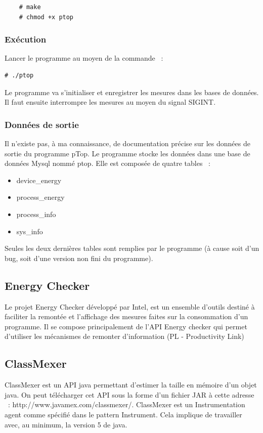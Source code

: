 \documentclass[a4paper, 11pt]{report}
\begin{document}
\begin{verbatim}
	# make
	# chmod +x ptop
\end{verbatim}

\subsubsection{Exécution}
Lancer le programme au moyen de la commande ~:

\begin{verbatim}
# ./ptop
\end{verbatim}

Le programme va s'initialiser et enregistrer les mesures dans les bases de données. Il faut ensuite interrompre les mesures au moyen du signal SIGINT.

\subsubsection{Données de sortie}
Il n’existe pas, à ma connaissance, de documentation précise sur les données de sortie du programme pTop.  Le programme stocke les données dans une base de données Mysql nommé ptop. Elle est composée de quatre tables ~:
\begin{itemize}
	\item device\_energy
	\item process\_energy
	\item process\_info
	\item sys\_info
\end{itemize}

Seules les deux dernières tables sont remplies par le programme (à cause soit d’un bug, soit d’une version non fini du programme).

\subsection{Energy Checker}
Le projet Energy Checker développé par Intel, est un ensemble d’outils destiné à faciliter la remontée et l’affichage des mesures faites sur la consommation d’un programme. Il se compose principalement de l’API Energy checker qui permet d’utiliser les mécanismes de remonter d’information (PL - Productivity Link)

\subsection{ClassMexer}
ClassMexer est un API java permettant d’estimer la taille en mémoire d’un objet java. On peut télécharger cet API sous la forme d’un fichier JAR à cette adresse ~: http://www.javamex.com/classmexer/. ClassMexer est un Instrumentation agent comme spécifié dans le pattern Instrument. Cela implique de travailler avec, au minimum, la version 5 de java.
\end{document}
